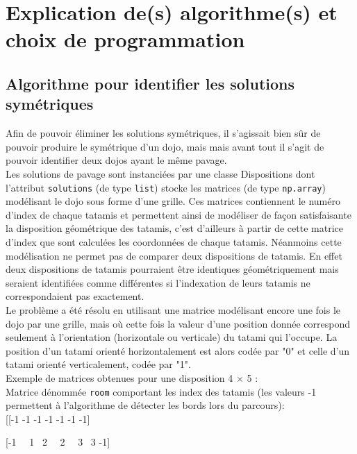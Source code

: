 \section{Explication de(s) algorithme(s) et choix de programmation}

\subsection{Algorithme pour identifier les solutions symétriques}

Afin de pouvoir éliminer les solutions symétriques, il s’agissait bien sûr de pouvoir produire le symétrique d’un dojo, 
mais mais avant tout il s’agit de pouvoir identifier deux dojos ayant le même pavage.\\

Les solutions de pavage sont instanciées par une classe Dispositions dont l’attribut \texttt{solutions}  (de type \texttt{list}) stocke 
les matrices (de type \texttt{np.array}) modélisant le dojo sous forme d’une grille. Ces matrices contiennent le numéro d’index de 
chaque tatamis et permettent ainsi de modéliser de façon satisfaisante la disposition géométrique des tatamis, c’est d’ailleurs 
à partir de cette matrice d’index que sont calculées les coordonnées de chaque tatamis. Néanmoins cette modélisation ne permet 
pas de comparer deux dispositions de tatamis. En effet deux dispositions de tatamis pourraient être identiques géométriquement 
mais seraient identifiées comme différentes si l’indexation de leurs tatamis ne correspondaient pas exactement.\\

Le problème a été résolu en utilisant une matrice modélisant encore une fois le dojo par une grille, mais où cette fois la valeur d’une 
position donnée correspond seulement à l’orientation (horizontale ou verticale) du tatami qui l’occupe. La position d'un tatami orienté
horizontalement est alors codée par "0" et celle d'un tatami orienté verticalement, codée par "1".\\

Exemple de matrices obtenues pour une disposition 4 $\times$ 5 :\\


    Matrice dénommée \texttt{room} comportant les index des tatamis (les valeurs -1 permettent à l’algorithme de détecter les bords lors du parcours):\\

[[-1 -1 -1 -1 -1 -1 -1]

 [-1  ~~1  ~2  ~~2  ~~3  ~3 -1]


